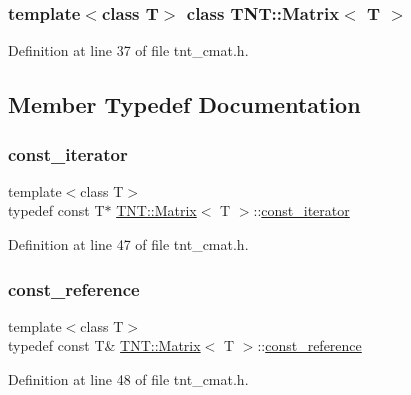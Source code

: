 \subsubsection*{template$<$class T$>$\newline
class T\+N\+T\+::\+Matrix$<$ T $>$}



Definition at line 37 of file tnt\+\_\+cmat.\+h.



\subsection{Member Typedef Documentation}
\mbox{\label{classTNT_1_1Matrix_a39334142ce0b5ee917e7b222a6b5637b}} 
\subsubsection{\texorpdfstring{const\+\_\+iterator}{const\_iterator}}
{\footnotesize\ttfamily template$<$class T$>$ \\
typedef const T$\ast$ \hyperlink{classTNT_1_1Matrix}{T\+N\+T\+::\+Matrix}$<$ T $>$\+::\hyperlink{classTNT_1_1Matrix_a39334142ce0b5ee917e7b222a6b5637b}{const\+\_\+iterator}}



Definition at line 47 of file tnt\+\_\+cmat.\+h.

\mbox{\label{classTNT_1_1Matrix_a6d3ceefbf1675aad4acadac4f78ed04b}} 
\subsubsection{\texorpdfstring{const\+\_\+reference}{const\_reference}}
{\footnotesize\ttfamily template$<$class T$>$ \\
typedef const T\& \hyperlink{classTNT_1_1Matrix}{T\+N\+T\+::\+Matrix}$<$ T $>$\+::\hyperlink{classTNT_1_1Matrix_a6d3ceefbf1675aad4acadac4f78ed04b}{const\+\_\+reference}}



Definition at line 48 of file tnt\+\_\+cmat.\+h.

